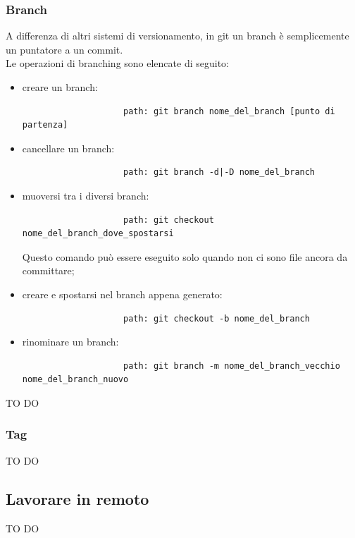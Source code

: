 		\subsubsection{Branch} %
		\label{ssub:branch}
		A differenza di altri sistemi di versionamento, in git un branch è semplicemente un puntatore a un commit. \\
		Le operazioni di branching sono elencate di seguito:
			\begin{itemize}
				\item creare un branch:
					\begin{verbatim}
					path: git branch nome_del_branch [punto di partenza]
					\end{verbatim}
				\item cancellare un branch:
					\begin{verbatim}
					path: git branch -d|-D nome_del_branch
					\end{verbatim}
				\item muoversi tra i diversi branch:
					\begin{verbatim}
					path: git checkout nome_del_branch_dove_spostarsi
					\end{verbatim}
				Questo comando può essere eseguito solo quando non ci sono file ancora da committare;
				\item creare e spostarsi nel branch appena generato:
					\begin{verbatim}
					path: git checkout -b nome_del_branch
					\end{verbatim}
				\item rinominare un branch:
					\begin{verbatim}
					path: git branch -m nome_del_branch_vecchio nome_del_branch_nuovo
					\end{verbatim}
			\end{itemize}
			\noindent
		TO DO


		\subsubsection{Tag} %
		\label{ssub:tag}
		TO DO
		
	
	\subsection{Lavorare in remoto} %
	\label{sub:lavorare_in_remoto}
	TO DO
